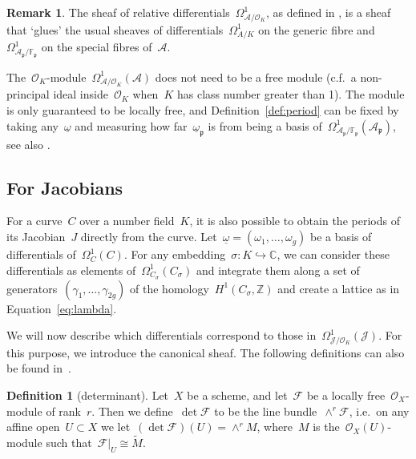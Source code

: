 \documentclass[12pt]{article}
\theoremstyle{definition}
\newtheorem{definition}[theorem]{Definition}
\newtheorem{remark}[theorem]{Remark}
\numberwithin{equation}{subsection}
\newcommand{\C}{\ensuremath{\mathbb{C}}}
\newcommand{\Z}{\ensuremath{\mathbb{Z}}}
\begin{document}
\begin{remark}
The sheaf of relative differentials~$\Omega^1_{\mathcal{A}/\mathcal{O}_K}$, as defined in \cite[Sect.~6.1]{Liu}, is a sheaf that `glues' the usual sheaves of differentials~$\Omega^1_{A/K}$ on the generic fibre and~$\Omega^1_{\mathcal{A}_{\mathfrak{p}}/\mathbb{F}_{\mathfrak{p}}}$ on the special fibres of~$\mathcal{A}$.

The~$\mathcal{O}_K$-module~$\Omega^1_{\mathcal{A}/\mathcal{O}_K}(\mathcal{A})$ does not need to be a free module (c.f.\ a non-principal ideal inside~$\mathcal{O}_K$ when~$K$ has class number greater than 1). The module is only guaranteed to be locally free, and Definition~\ref{def:period} can be fixed by taking any~$\underline{\omega}$ and measuring how far~$\underline{\omega}_\mathfrak{p}$ is from being a basis of~$\Omega^1_{\mathcal{A}_{\mathfrak{p}}/\mathbb{F}_{\mathfrak{p}}}(\mathcal{A}_\mathfrak{p})$, see also \cite[Subsect.~1.3.4]{PhD}.
\end{remark}

\subsection{For Jacobians}

For a curve~$C$ over a number field~$K$, it is also possible to obtain the periods of its Jacobian~$J$ directly from the curve.
Let~$\underline{\omega} = (\omega_1, \ldots, \omega_g)$ be a basis of differentials of~$\Omega_C^1(C)$.
For any embedding~$\sigma \colon K \hookrightarrow \C$, we can consider these differentials as elements of~$\Omega^1_{C_\sigma}(C_\sigma)$ and integrate them along a set of generators~$(\gamma_1, \ldots, \gamma_{2g})$ of the homology~$H^1(C_\sigma, \Z)$ and create a lattice as in Equation~\eqref{eq:lambda}.

We will now describe which differentials correspond to those in~$\Omega^1_{\mathcal{J}/\mathcal{O}_K}(\mathcal{J})$. For this purpose, we introduce the canonical sheaf. The following definitions can also be found in~\cite[Sect.~6.4]{Liu}.

\begin{definition}[determinant]
Let~$X$ be a scheme, and let~$\mathcal{F}$ be a locally free~$\mathcal{O}_X$-module of rank~$r$.
Then we define~$\det \mathcal{F}$ to be the line bundle~$\wedge^r \mathcal{F}$, i.e.\ on any affine open~$U\subset X$ we let~$(\det \mathcal{F})(U) = \wedge^r M$, where~$M$ is the~$\mathcal{O}_X(U)$-module such that~$\mathcal{F}|_U \cong \widetilde{M}$.
\end{definition}
\end{document}
